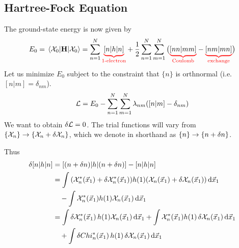 \documentclass[12pt,a4paper,titlepage]{article}
\newcommand{\trm}[1]{\textrm{#1}} %
\newcommand{\Chi}{\mathcal{X}} %
\begin{document}
\subsection{Hartree-Fock Equation}
The ground-state energy is now given by
\begin{equation}
E_{0}=\mel{\Chi_{0}}{\vb{H}}{\Chi_{0}}=\sum_{n=1}^{N}{\color{red}\underbrace{\color{black}[n|h|n]}_{\trm{1-electron}}}+\frac{1}{2}\sum_{n=1}^{N}\sum_{m=1}^{N}\big({\color{red}\underbrace{\color{black}[nn|mm]}_{\trm{Coulomb}}}-{\color{red}\underbrace{\color{black}[nm|mn]}_{\trm{exchange}}}\big)
\end{equation}
Let us minimize $E_{0}$ subject to the constraint that $\{n\}$ is orthnormal (i.e. $[n|m]=\delta_{nm}$).
\begin{equation}
\mathcal{L}=E_{0}-\sum_{n=1}^{N}\sum_{m=1}^{N}\lambda_{nm}\qty([n|m]-\delta_{nm})
\end{equation}
We want to obtain $\var{\mathcal{L}}=0$. The trial functions will vary from $\{\Chi_{n}\}\rightarrow\{\Chi_{n}+\var{\Chi_{n}}\}$, which we denote in shorthand as $\{n\}\rightarrow\{n+\var{n}\}$.
\begin{center}
\end{center}
Thus
\begin{equation}
\begin{aligned}
\var{[n|h|n]}&=[(n+\var{n})|h|(n+\var{n})]-[n|h|n]\\
&=\int\qty(\Chi_{n}^{*}(\vec{x}_{1})+\var{\Chi_{n}^{*}(\vec{x}_{1})})h(1)\qty(\Chi_{n}(\vec{x}_{1})+\var{\Chi_{n}(\vec{x}_{1})})\dd{\vec{x}_{1}}\\
&\quad-\int\Chi_{n}^{*}(\vec{x}_{1})h(1)\Chi_{n}(\vec{x}_{1})\dd{\vec{x}_{1}}\\
&=\int\var{\Chi_{n}^{*}(\vec{x}_{1})}h(1)\Chi_{n}(\vec{x}_{1})\dd{\vec{x}_{1}}+\int\Chi_{n}^{*}(\vec{x}_{1})h(1)\var{\Chi_{n}(\vec{x}_{1})}\dd{\vec{x}_{1}}\\
&\quad+\int\var{Chi_{n}^{*}(\vec{x}_{1})}h(1)\var{\Chi_{n}(\vec{x}_{1})}\dd{\vec{x}_{1}}
\end{aligned}
\end{equation}
\end{document}
